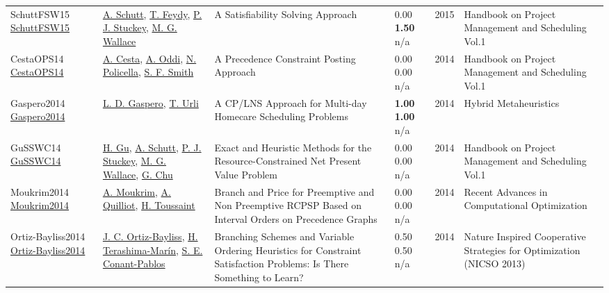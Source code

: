 {\begin{longtable}{p{3cm}p{5cm}p{10cm}p{1cm}rp{2.5cm}l}
SchuttFSW15 \href{https://doi.org/10.1007/978-3-319-05443-8_7}{SchuttFSW15} & \hyperref[auth:a124]{A. Schutt}, \hyperref[auth:a154]{T. Feydy}, \hyperref[auth:a125]{P. J. Stuckey}, \hyperref[auth:a117]{M. G. Wallace} & A Satisfiability Solving Approach & \noindent{}\textcolor{black!50}{0.00} \textbf{1.50} n/a & 2015 & Handbook on Project Management and Scheduling Vol.1 & \cite{SchuttFSW15}\\
CestaOPS14 \href{http://dx.doi.org/10.1007/978-3-319-05443-8_6}{CestaOPS14} & \hyperref[auth:a284]{A. Cesta}, \hyperref[auth:a282]{A. Oddi}, \hyperref[auth:a283]{N. Policella}, \hyperref[auth:a298]{S. F. Smith} & A Precedence Constraint Posting Approach & \noindent{}\textcolor{black!50}{0.00} \textcolor{black!50}{0.00} n/a & 2014 & Handbook on Project Management and Scheduling Vol.1 & \cite{CestaOPS14}\\
Gaspero2014 \href{http://dx.doi.org/10.1007/978-3-319-07644-7_1}{Gaspero2014} & \hyperref[auth:a2043]{L. D. Gaspero}, \hyperref[auth:a2044]{T. Urli} & A CP/LNS Approach for Multi-day Homecare Scheduling Problems & \noindent{}\textbf{1.00} \textbf{1.00} n/a & 2014 & Hybrid Metaheuristics & \cite{Gaspero2014}\\
GuSSWC14 \href{http://dx.doi.org/10.1007/978-3-319-05443-8_14}{GuSSWC14} & \hyperref[auth:a336]{H. Gu}, \hyperref[auth:a124]{A. Schutt}, \hyperref[auth:a125]{P. J. Stuckey}, \hyperref[auth:a117]{M. G. Wallace}, \hyperref[auth:a343]{G. Chu} & Exact and Heuristic Methods for the Resource-Constrained Net Present Value Problem & \noindent{}\textcolor{black!50}{0.00} \textcolor{black!50}{0.00} n/a & 2014 & Handbook on Project Management and Scheduling Vol.1 & \cite{GuSSWC14}\\
Moukrim2014 \href{http://dx.doi.org/10.1007/978-3-319-12631-9_6}{Moukrim2014} & \hyperref[auth:a1170]{A. Moukrim}, \hyperref[auth:a789]{A. Quilliot}, \hyperref[auth:a1700]{H. Toussaint} & Branch and Price for Preemptive and Non Preemptive RCPSP Based on Interval Orders on Precedence Graphs & \noindent{}\textcolor{black!50}{0.00} \textcolor{black!50}{0.00} n/a & 2014 & Recent Advances in Computational Optimization & \cite{Moukrim2014}\\
Ortiz-Bayliss2014 \href{http://dx.doi.org/10.1007/978-3-319-01692-4_25}{Ortiz-Bayliss2014} & \hyperref[auth:a1781]{J. C. Ortiz-Bayliss}, \hyperref[auth:a1608]{H. Terashima-Marín}, \hyperref[auth:a1782]{S. E. Conant-Pablos} & \cellcolor{green!10}Branching Schemes and Variable Ordering Heuristics for Constraint Satisfaction Problems: Is There Something to Learn? & \noindent{}0.50 0.50 n/a & 2014 & Nature Inspired Cooperative Strategies for Optimization (NICSO 2013) & \cite{Ortiz-Bayliss2014}\\

\end{longtable}}
